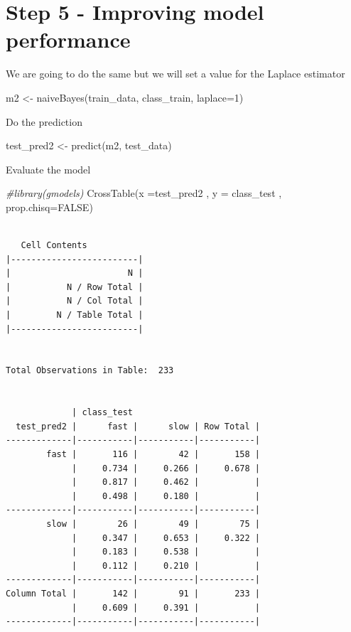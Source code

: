 \documentclass[
]{article}
\newenvironment{Shaded}{\begin{snugshade}}{\end{snugshade}}
\newcommand{\AttributeTok}[1]{\textcolor[rgb]{0.77,0.63,0.00}{#1}}
\newcommand{\CommentTok}[1]{\textcolor[rgb]{0.56,0.35,0.01}{\textit{#1}}}
\newcommand{\ConstantTok}[1]{\textcolor[rgb]{0.00,0.00,0.00}{#1}}
\newcommand{\DecValTok}[1]{\textcolor[rgb]{0.00,0.00,0.81}{#1}}
\newcommand{\FunctionTok}[1]{\textcolor[rgb]{0.00,0.00,0.00}{#1}}
\newcommand{\NormalTok}[1]{#1}
\newcommand{\OtherTok}[1]{\textcolor[rgb]{0.56,0.35,0.01}{#1}}
\begin{document}
\hypertarget{step-5---improving-model-performance}{%
\section{Step 5 - Improving model
performance}\label{step-5---improving-model-performance}}

We are going to do the same but we will set a value for the Laplace
estimator

\begin{Shaded}
\begin{Highlighting}[]
\NormalTok{m2 }\OtherTok{\textless{}{-}} \FunctionTok{naiveBayes}\NormalTok{(train\_data, class\_train, }\AttributeTok{laplace=}\DecValTok{1}\NormalTok{)}
\end{Highlighting}
\end{Shaded}

Do the prediction

\begin{Shaded}
\begin{Highlighting}[]
\NormalTok{test\_pred2 }\OtherTok{\textless{}{-}} \FunctionTok{predict}\NormalTok{(m2, test\_data)}
\end{Highlighting}
\end{Shaded}

Evaluate the model

\begin{Shaded}
\begin{Highlighting}[]
\CommentTok{\#library(gmodels)}
\FunctionTok{CrossTable}\NormalTok{(}\AttributeTok{x =}\NormalTok{test\_pred2 , }\AttributeTok{y =}\NormalTok{ class\_test , }\AttributeTok{prop.chisq=}\ConstantTok{FALSE}\NormalTok{)}
\end{Highlighting}
\end{Shaded}

\begin{verbatim}
 
   Cell Contents
|-------------------------|
|                       N |
|           N / Row Total |
|           N / Col Total |
|         N / Table Total |
|-------------------------|

 
Total Observations in Table:  233 

 
             | class_test 
  test_pred2 |      fast |      slow | Row Total | 
-------------|-----------|-----------|-----------|
        fast |       116 |        42 |       158 | 
             |     0.734 |     0.266 |     0.678 | 
             |     0.817 |     0.462 |           | 
             |     0.498 |     0.180 |           | 
-------------|-----------|-----------|-----------|
        slow |        26 |        49 |        75 | 
             |     0.347 |     0.653 |     0.322 | 
             |     0.183 |     0.538 |           | 
             |     0.112 |     0.210 |           | 
-------------|-----------|-----------|-----------|
Column Total |       142 |        91 |       233 | 
             |     0.609 |     0.391 |           | 
-------------|-----------|-----------|-----------|

 
\end{verbatim}
\end{document}
